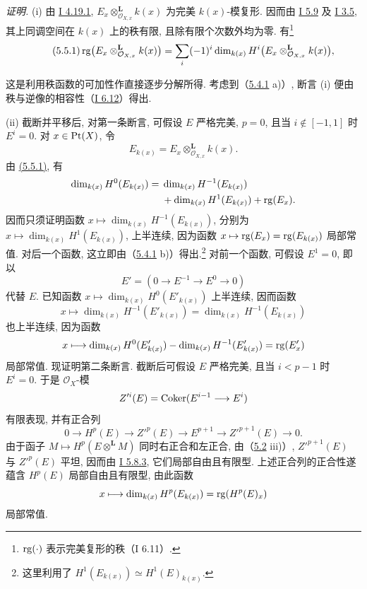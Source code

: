 \emph{证明.} (i) 由 \hyperlink{sga6.e01.cor.4-19-1}{I 4.19.1}, \(E_x\otimes_{\mathcal O_{X,x}}^{\mathbf L}k(x)\) 为完美 \(k(x)\)-模复形. 因而由 \hyperlink{sga6.e01.cor.5-9}{I 5.9} 及 \hyperlink{sga6.e01.cor.3-5}{I 3.5}, 其上同调空间在 \(k(x)\) 上的秩有限, 且除有限个次数外均为零. 有\footnote{\(\operatorname{rg}(\cdot)\) 表示完美复形的秩（I 6.11）.}
\begin{equation}\tag{5.5.1}
\operatorname{rg}\bigl(E_x\otimes_{\mathcal O_{X,x}}^{\mathbf L}k(x)\bigr)
=\sum_i(-1)^i\dim_{k(x)}H^i\bigl(E_x\otimes_{\mathcal O_{X,x}}^{\mathbf L}k(x)\bigr),
\end{equation}

这是利用秩函数的可加性作直接逐步分解所得. 考虑到（\hyperlink{sga6.e03.ex.5-4-1}{5.4.1} a)）, 断言 (i) 便由秩与逆像的相容性（\hyperlink{sga6.e01.prop.6-12}{I 6.12}）得出.

(ii) 截断并平移后, 对第一条断言, 可假设 \(E\) 严格完美, \(p=0\), 且当 \(i\notin[-1,1]\) 时 \(E^i=0\). 对 \(x\in\operatorname{Pt}(X)\), 令
\[
E_{k(x)}=E_x\otimes_{\mathcal O_{X,x}}^{\mathbf L}k(x).
\]
由 \hyperlink{sga6.e03.eq.5-5-1}{(5.5.1)}, 有
\[
\begin{aligned}
\dim_{k(x)}H^0(E_{k(x)})={}&\dim_{k(x)}H^{-1}(E_{k(x)})\\
&+\dim_{k(x)}H^1(E_{k(x)})+\operatorname{rg}(E_x).
\end{aligned}
\]
因而只须证明函数 \(x\mapsto\dim_{k(x)}H^{-1}(E_{k(x)})\), 分别为 \(x\mapsto\dim_{k(x)}H^1(E_{k(x)})\), 上半连续, 因为函数 \(x\mapsto\operatorname{rg}(E_x)=\operatorname{rg}(E_{k(x)})\) 局部常值. 对后一个函数, 这立即由（\hyperlink{sga6.e03.ex.5-4-1}{5.4.1} b)）得出.\footnote{这里利用了 \(H^1(E_{k(x)})\simeq H^1(E)_{k(x)}\).}
对前一个函数, 可假设 \(E^1=0\), 即以
\[
E'=(0\longrightarrow E^{-1}\longrightarrow E^0\longrightarrow0)
\]
代替 \(E\). 已知函数 \(x\mapsto\dim_{k(x)}H^0(E'_{k(x)})\) 上半连续, 因而函数
\[
x\longmapsto\dim_{k(x)}H^{-1}(E'_{k(x)})=\dim_{k(x)}H^{-1}(E_{k(x)})
\]
也上半连续, 因为函数
\[
x\longmapsto\dim_{k(x)}H^0(E'_{k(x)})-\dim_{k(x)}H^{-1}(E'_{k(x)})=\operatorname{rg}(E'_x)
\]
局部常值. 现证明第二条断言. 截断后可假设 \(E\) 严格完美, 且当 \(i<p-1\) 时 \(E^i=0\). 于是 \(\mathcal O_X\)-模
\[
Z'^i(E)=\operatorname{Coker}(E^{i-1}\longrightarrow E^i)
\]
有限表现, 并有正合列
\[
0\longrightarrow H^p(E)\longrightarrow Z'^p(E)\longrightarrow E^{p+1}\longrightarrow Z'^{p+1}(E)\longrightarrow0.
\]
由于函子 \(M\mapsto H^p(E\otimes^{\mathbf L}M)\) 同时右正合和左正合, 由（\hyperlink{sga6.e03.rem.5-2}{5.2} iii)）, \(Z'^{p+1}(E)\) 与 \(Z'^p(E)\) 平坦, 因而由 \hyperlink{sga6.e01.lem.5-8-3}{I 5.8.3}, 它们局部自由且有限型. 上述正合列的正合性遂蕴含 \(H^p(E)\) 局部自由且有限型, 由此函数
\[
x\longmapsto\dim_{k(x)}H^p(E_{k(x)})=\operatorname{rg}(H^p(E)_x)
\]
局部常值.

